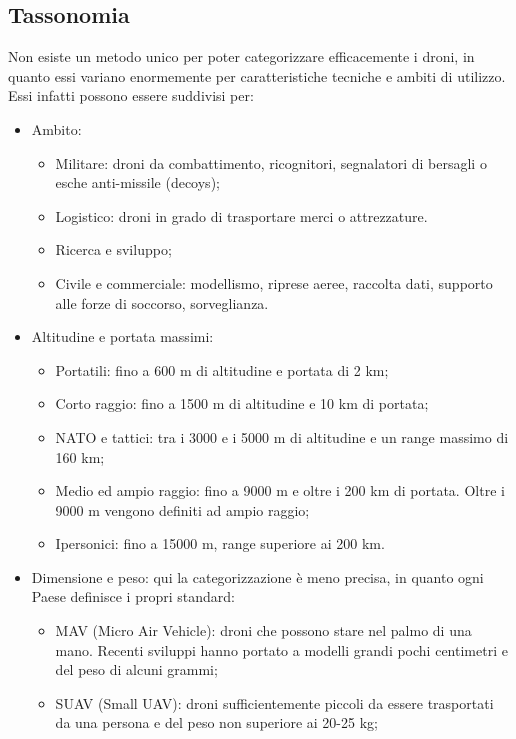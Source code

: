 \subsection[Tassonomia]{Tassonomia}
Non esiste un metodo unico per poter categorizzare efficacemente i droni, in quanto essi variano enormemente per caratteristiche tecniche e ambiti di utilizzo. Essi infatti possono essere suddivisi per:
\begin{itemize}
	\item Ambito:
		\begin{itemize}
			\item Militare: droni da combattimento, ricognitori, segnalatori di bersagli o esche anti-missile (decoys);
			\item Logistico: droni in grado di trasportare merci o attrezzature.
			\item Ricerca e sviluppo;
			\item Civile e commerciale: modellismo, riprese aeree, raccolta dati, supporto alle forze di soccorso, sorveglianza.
		\end{itemize}
	\item Altitudine e portata massimi:
		\begin{itemize}
			\item Portatili: fino a 600 m di altitudine e portata di 2 km; 
			\item Corto raggio: fino a 1500 m di altitudine e 10 km di portata;
			\item NATO e tattici: tra i 3000 e i 5000 m di altitudine e un range massimo di 160 km;
			\item Medio ed ampio raggio: fino a 9000 m e oltre i 200 km di portata. Oltre i 9000 m vengono definiti ad ampio raggio;
			\item Ipersonici:  fino a 15000 m, range superiore ai 200 km.
		\end{itemize}
	\item Dimensione e peso: qui la categorizzazione è meno precisa, in quanto ogni Paese definisce i propri standard:
		\begin{itemize}
			\item MAV (Micro Air Vehicle): droni che possono stare nel palmo di una mano. Recenti sviluppi hanno portato a modelli grandi pochi centimetri e del peso di alcuni grammi;
			\item SUAV (Small UAV): droni sufficientemente piccoli da essere trasportati da una persona e del peso non superiore ai 20-25 kg;

\end{itemize}
\end{itemize}
